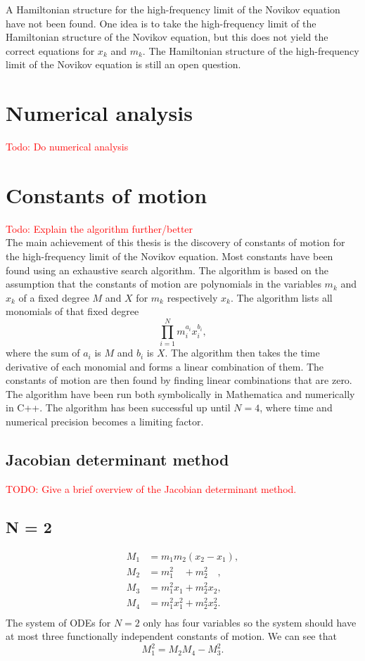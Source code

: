 \documentclass[english,master]{liumaiex}
\theoremstyle{plain}
\theoremstyle{definition}
\newcommand\todo[1]{\textcolor{red}{#1}}
\begin{document}
A Hamiltonian structure for the high-frequency limit of the Novikov equation have not been found. One idea is to take the high-frequency limit of the Hamiltonian structure of the Novikov equation, but this does not yield the correct equations for $x_k$ and $m_k$. The Hamiltonian structure of the high-frequency limit of the Novikov equation is still an open question.

\section{Numerical analysis}
\todo{Todo: Do numerical analysis}

\section{Constants of motion}

\todo{Todo: Explain the algorithm further/better}\\
The main achievement of this thesis is the discovery of constants of motion for the high-frequency limit of the Novikov equation. Most constants have been found using an exhaustive search algorithm. The algorithm is based on the assumption that the constants of motion are polynomials in the variables $m_k$ and $x_k$ of a fixed degree $M$ and $X$ for $m_k$ respectively $x_k$. The algorithm lists all monomials of that fixed degree
\begin{equation}
	\prod_{i=1}^{N} m_i^{a_i} x_i^{b_i},
\end{equation}
where the sum of $a_i$ is $M$ and $b_i$ is $X$. The algorithm then takes the time derivative of each monomial and forms a linear combination of them. The constants of motion are then found by finding linear combinations that are zero. The algorithm have been run both symbolically in Mathematica and numerically in C++. The algorithm has been successful up until $N = 4$, where time and numerical precision becomes a limiting factor.

\subsection{Jacobian determinant method}
\todo{TODO: Give a brief overview of the Jacobian determinant method.}

\subsection*{N = 2}

\begin{align}
	M_1 &= m_1 m_2 (x_2 - x_1), \\
	M_2 &= m_1^2\phantom{x_1} + m_2^2\phantom{x_2}, \\
	M_3 &= m_1^2 x_1 + m_2^2 x_2, \\
	M_4 &= m_1^2 x_1^2 + m_2^2 x_2^2. \\
\end{align}
%
The system of ODEs for $N = 2$ only has four variables so the system should have at most three functionally independent constants of motion. We can see that
\begin{equation}
	M_1^2 = M_2M_4 - M_3^2.
\end{equation}
\end{document}
